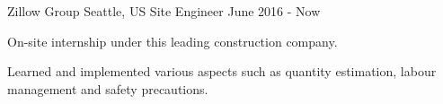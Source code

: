 \documentclass{resume}
\begin{document}
\begin{rSubsection}
  {Zillow Group}
  {Seattle, US}
  {Site Engineer}
  {June 2016 - Now}
      \item On-site internship under this leading construction company. 
      \item Learned and implemented various aspects such as quantity estimation, labour management and safety precautions.
  \end{rSubsection}
\end{document}
